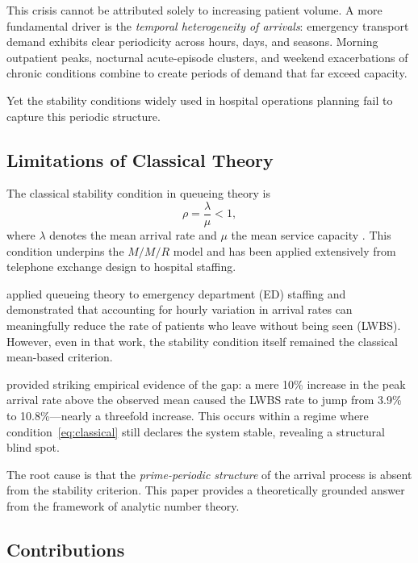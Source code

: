 \documentclass[12pt]{article}
\begin{document}
This crisis cannot be attributed solely to increasing patient volume. 
A more fundamental driver is the \emph{temporal heterogeneity of 
arrivals}: emergency transport demand exhibits clear periodicity across 
hours, days, and seasons. Morning outpatient peaks, nocturnal 
acute-episode clusters, and weekend exacerbations of chronic conditions 
combine to create periods of demand that far exceed capacity.

Yet the stability conditions widely used in hospital operations planning 
fail to capture this periodic structure.

\subsection{Limitations of Classical Theory}

The classical stability condition in queueing theory is
\begin{equation}\label{eq:classical}
  \rho = \frac{\lambda}{\mu} < 1,
\end{equation}
where $\lambda$ denotes the mean arrival rate and $\mu$ the mean service 
capacity \citep{Erlang1917,Kendall1953}. This condition underpins the 
$M/M/R$ model and has been applied extensively from telephone exchange 
design to hospital staffing.

\citet{Green2006} applied queueing theory to emergency department (ED) 
staffing and demonstrated that accounting for hourly variation in arrival 
rates can meaningfully reduce the rate of patients who leave without being 
seen (LWBS). However, even in that work, the stability condition itself 
remained the classical mean-based criterion.

\citet{Wiler2013} provided striking empirical evidence of the gap: 
a mere 10\% increase in the peak arrival rate above the observed mean 
caused the LWBS rate to jump from 3.9\% to 10.8\%---nearly a threefold 
increase. This occurs within a regime where condition~\eqref{eq:classical} 
still declares the system stable, revealing a structural blind spot.

The root cause is that the \emph{prime-periodic structure} of the arrival 
process is absent from the stability criterion. This paper provides a 
theoretically grounded answer from the framework of analytic number theory.

\subsection{Contributions}
\end{document}
